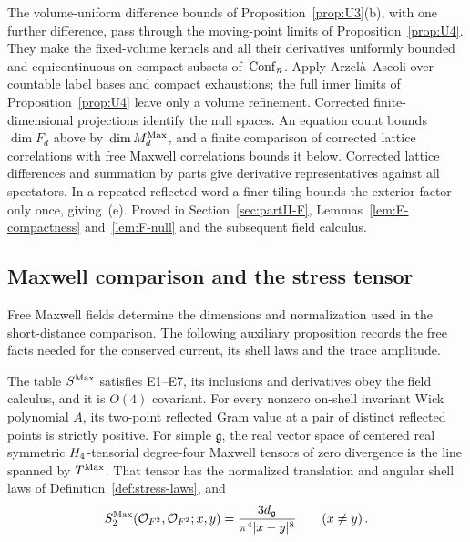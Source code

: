 The volume-uniform difference bounds of Proposition~\ref{prop:U3}\textup{(b)}, with one further difference, pass through the moving-point limits of Proposition~\ref{prop:U4}. They make the fixed-volume kernels and all their derivatives uniformly bounded and equicontinuous on compact subsets of~$\mathrm{Conf}_{n}$. Apply Arzelà--Ascoli over countable label bases and compact exhaustions; the full inner limits of Proposition~\ref{prop:U4} leave only a volume refinement. Corrected finite-dimensional projections identify the null spaces. An equation count bounds~$\dim F_d$ above by~$\dim M_{d}^{\mathrm{Max}}$, and a finite comparison of corrected lattice correlations with free Maxwell correlations bounds it below. Corrected lattice differences and summation by parts give derivative representatives against all spectators. In a repeated reflected word a finer tiling bounds the exterior factor only once, giving~\textup{(e)}. Proved in Section~\ref{sec:partII-F}, Lemmas~\ref{lem:F-compactness} and~\ref{lem:F-null} and the subsequent field calculus.

\subsection{Maxwell comparison and the stress tensor}

Free Maxwell fields determine the dimensions and normalization used in the
short-distance comparison. The following auxiliary proposition records the
free facts needed for the conserved current, its shell laws and the trace
amplitude.

\begin{proposition}\label{prop:free-maxwell}
The table $S^{\mathrm{Max}}$ satisfies E1–E7, its inclusions and derivatives obey the field calculus, and it is $O(4)$ covariant. For every nonzero on-shell invariant Wick polynomial $A$, its two-point reflected Gram value at a pair of distinct reflected points is strictly positive. For simple $\mathfrak g$, the real vector space of centered real symmetric $H_4$-tensorial degree-four Maxwell tensors of zero divergence is the line spanned by $T^{\mathrm{Max}}$. That tensor has the normalized translation and angular shell laws of Definition~\ref{def:stress-laws}, and
\begin{equation}\label{eq:free-maxwell-1}
S^{\mathrm{Max}}_2(\mathcal{O}_{F^2},\mathcal{O}_{F^2};x,y)=\frac{3d_{\mathfrak{g}}}{\pi^4|x-y|^8}\qquad(x\ne y)\,.
\end{equation}
\end{proposition}

